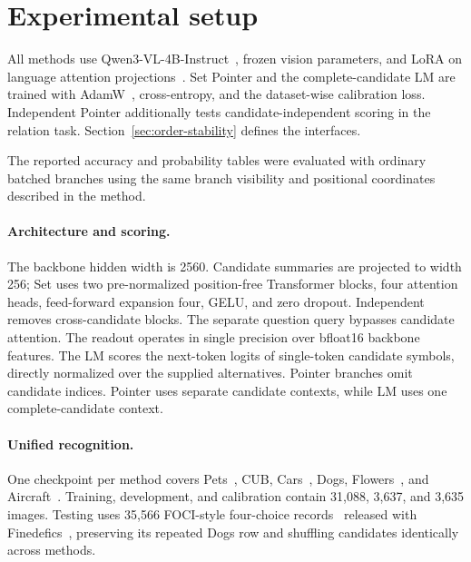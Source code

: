 \section{Experimental setup}
All methods use Qwen3-VL-4B-Instruct~\citep{bai_2025_qwen3vl}, frozen vision parameters, and LoRA on language attention projections~\citep{hu_2021_lora}. Set Pointer and the complete-candidate LM are trained with AdamW~\citep{loshchilov_2017_adamw}, cross-entropy, and the dataset-wise calibration loss. Independent Pointer additionally tests candidate-independent scoring in the relation task. Section~\ref{sec:order-stability} defines the interfaces.

The reported accuracy and probability tables were evaluated with ordinary batched branches using the same branch visibility and positional coordinates described in the method.

\paragraph{Architecture and scoring.}
The backbone hidden width is 2560. Candidate summaries are projected to width 256; Set uses two pre-normalized position-free Transformer blocks, four attention heads, feed-forward expansion four, GELU, and zero dropout. Independent removes cross-candidate blocks. The separate question query bypasses candidate attention. The readout operates in single precision over bfloat16 backbone features. The LM scores the next-token logits of single-token candidate symbols, directly normalized over the supplied alternatives. Pointer branches omit candidate indices. Pointer uses separate candidate contexts, while LM uses one complete-candidate context.

\paragraph{Unified recognition.}
One checkpoint per method covers Pets~\citep{parkhi_2012_pets}, CUB, Cars~\citep{krause_2013_cars}, Dogs, Flowers~\citep{nilsback_2008_flowers}, and Aircraft~\citep{maji_2013_aircraft}. Training, development, and calibration contain 31,088, 3,637, and 3,635 images. Testing uses 35,566 FOCI-style four-choice records~\citep{geigle_2024_foci} released with Finedefics~\citep{he_2025_finedefics}, preserving its repeated Dogs row and shuffling candidates identically across methods.

